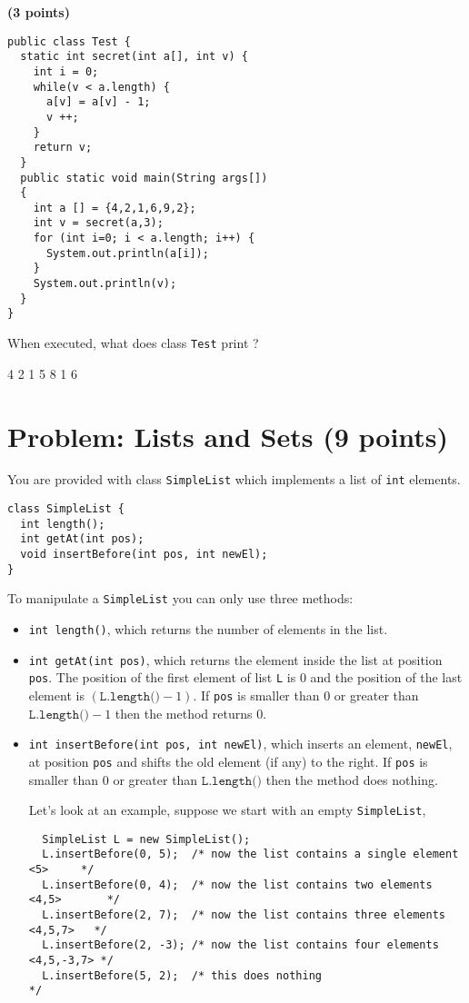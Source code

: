 \documentclass[correction]{exercices}
\begin{document}
\begin{question} \textbf{(3 points)}
\begin{verbatim}
public class Test {
  static int secret(int a[], int v) {
    int i = 0;
    while(v < a.length) {
      a[v] = a[v] - 1;
      v ++;
    }
    return v;
  }
  public static void main(String args[])
  {
    int a [] = {4,2,1,6,9,2};
    int v = secret(a,3);
    for (int i=0; i < a.length; i++) {
      System.out.println(a[i]);
    }
    System.out.println(v);
  }
}
\end{verbatim}

When executed, what does class \verb!Test! print ?
\begin{correction}
4
2
1
5
8
1
6
\end{correction}
\end{question}

\section{Problem: Lists and Sets (9 points)}
You are provided with class \verb!SimpleList! which
implements a list of \verb!int! elements.
\begin{verbatim}
class SimpleList {
  int length();
  int getAt(int pos);
  void insertBefore(int pos, int newEl);
}
\end{verbatim}

To manipulate a \verb!SimpleList! you can only use three methods:
\begin{itemize}
  \item \verb!int length()!, which returns the number of elements
    in the list.
  \item \verb!int getAt(int pos)!, which returns the
    element inside the list at position \verb!pos!.
    The position of the first element of list \verb!L! is $0$ and the
    position of the last element is $(\texttt{L.length()} - 1)$.
    If \verb!pos! is smaller than $0$ or greater than $\texttt{L.length()}-1$
    then the method returns $0$.
  \item \verb!int insertBefore(int pos, int newEl)!, which inserts an
    element, \verb!newEl!, at position \verb!pos! and shifts the old
    element (if any) to the right.
    If \verb!pos! is smaller than $0$ or greater than $\texttt{L.length()}$
    then the method does nothing.

    Let's look at an example, suppose we start with an empty \verb!SimpleList!,
\begin{verbatim}
  SimpleList L = new SimpleList();
  L.insertBefore(0, 5);  /* now the list contains a single element <5>     */
  L.insertBefore(0, 4);  /* now the list contains two elements <4,5>       */
  L.insertBefore(2, 7);  /* now the list contains three elements <4,5,7>   */
  L.insertBefore(2, -3); /* now the list contains four elements <4,5,-3,7> */
  L.insertBefore(5, 2);  /* this does nothing                              */
\end{verbatim}
\end{itemize}
\end{document}
